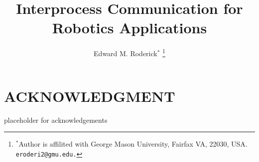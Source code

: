 \documentclass[letterpaper, 10 pt, conference]{ieeeconf}  %
\title{\LARGE \bf Interprocess Communication for Robotics Applications
}
\author{Edward M. Roderick$^{*}$
\thanks{$^{*}$Author is affilited with George Mason University, Fairfax VA, 22030, USA. {\tt\small eroderi2@gmu.edu.}}%
}
\begin{document}
\maketitle
\thispagestyle{empty}
\pagestyle{empty}










\addtolength{\textheight}{-12cm}   %


\section*{ACKNOWLEDGMENT}

placeholder for acknowledgements


\nocite{*}



\end{document}
